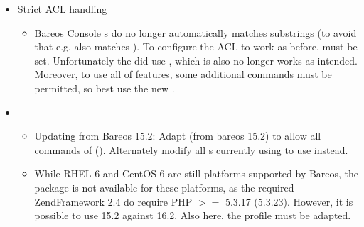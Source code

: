{\begin{itemize}
\begin{itemize}
         This way, the  will be configured automatically for the installed components.
     \end{itemize}
\item Strict ACL handling
     \begin{itemize}
     \item Bareos Console s do no longer automatically matches substrings
        (to avoid that e.g.  also matches ).
        To configure the ACL to work as before,  must be set.
        Unfortunately the   did use , which is also no longer works as intended. Moreover, to use all of  features, some additional commands must be permitted, so best use the new .
     \end{itemize}
\item \bareosWebui
     \begin{itemize}
     \item Updating from Bareos 15.2: Adapt  (from bareos 15.2) to allow all commands of  ().
     Alternately modify all s currently using  to use  instead.
     \item While RHEL 6 and CentOS 6 are still platforms supported by Bareos, the package  is not available for these platforms, as the required ZendFramework 2.4 do require PHP $>=$ 5.3.17 (5.3.23). However, it is possible to use  15.2 against  16.2. Also here, the profile must be adapted.
     \end{itemize}
\end{itemize}
}

